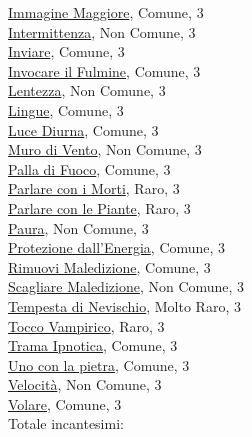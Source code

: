 \begin{multicols}{3}
{{\hyperlink{Immagine Maggiore}{Immagine Maggiore}, Comune, 3\\
\hyperlink{Intermittenza}{Intermittenza}, Non Comune, 3\\
\hyperlink{Inviare}{Inviare}, Comune, 3\\
\hyperlink{Invocare il Fulmine}{Invocare il Fulmine}, Comune, 3\\
\hyperlink{lentezza}{Lentezza}, Non Comune, 3\\
\hyperlink{Lingue}{Lingue}, Comune, 3\\
\hyperlink{Luce Diurna}{Luce Diurna}, Comune, 3\\
\hyperlink{Muro di Vento}{Muro di Vento}, Non Comune, 3\\
\hyperlink{Palla di Fuoco}{Palla di Fuoco}, Comune, 3\\
\hyperlink{Parlare con i Morti}{Parlare con i Morti}, Raro, 3\\
\hyperlink{Parlare con le Piante}{Parlare con le Piante}, Raro, 3\\
\hyperlink{Paura}{Paura}, Non Comune, 3\\
\hyperlink{Protezione dall'Energia}{Protezione dall'Energia}, Comune, 3\\
\hyperlink{Rimuovi Maledizione}{Rimuovi Maledizione}, Comune, 3\\
\hyperlink{Scagliare Maledizione}{Scagliare Maledizione}, Non Comune, 3\\
\hyperlink{Tempesta di Nevischio}{Tempesta di Nevischio}, Molto Raro, 3\\
\hyperlink{Tocco Vampirico}{Tocco Vampirico}, Raro, 3\\
\hyperlink{Trama Ipnotica}{Trama Ipnotica}, Comune, 3\\
\hyperlink{Uno con la pietra}{Uno con la pietra}, Comune, 3\\
\hyperlink{Velocità}{Velocità}, Non Comune, 3\\
\hyperlink{Volare}{Volare}, Comune, 3\\

\medskip Totale incantesimi: \theinclvtre\\

}}
\end{multicols}
